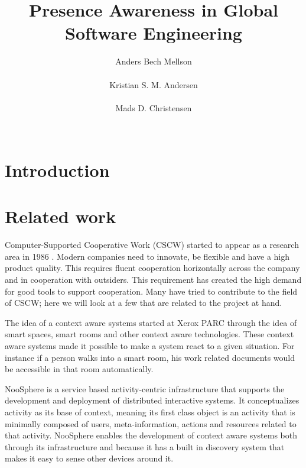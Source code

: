 \documentclass{sigchi}
\begin{document}
\title{Presence Awareness in Global Software Engineering}

\author{
  \alignauthor Anders Bech Mellson\\
    \\
  \alignauthor Kristian S. M. Andersen\\
    \\
  \alignauthor Mads D. Christensen\\
    \\
}

\maketitle

\begin{abstract}

\end{abstract}



\section{Introduction}

\section{Related work}
Computer-Supported Cooperative Work (CSCW) started to appear as a research area in 1986 \cite{schmidt1994cooperative}.
Modern companies need to innovate, be flexible and have a high product quality.
This requires fluent cooperation horizontally across the company and in cooperation with outsiders.
This requirement has created the high demand for good tools to support cooperation.
Many have tried to contribute to the field of CSCW; here we will look at a few that are related to the project at hand.

The idea of a context aware systems started at Xerox PARC through the idea of smart spaces, smart rooms and other context aware technologies.
These context aware systems made it possible to make a system react to a given situation.
For instance if a person walks into a smart room, his work related documents would be accessible in that room automatically.

NooSphere \cite{houben2013noosphere} is a service based activity-centric infrastructure that supports the development and deployment of distributed interactive systems.
It conceptualizes activity as its base of context, meaning its first class object is an activity that is minimally composed of users, meta-information, actions and resources related to that activity.
NooSphere enables the development of context aware systems both through its infrastructure and because it has a built in discovery system that makes it easy to sense other devices around it.
\end{document}
